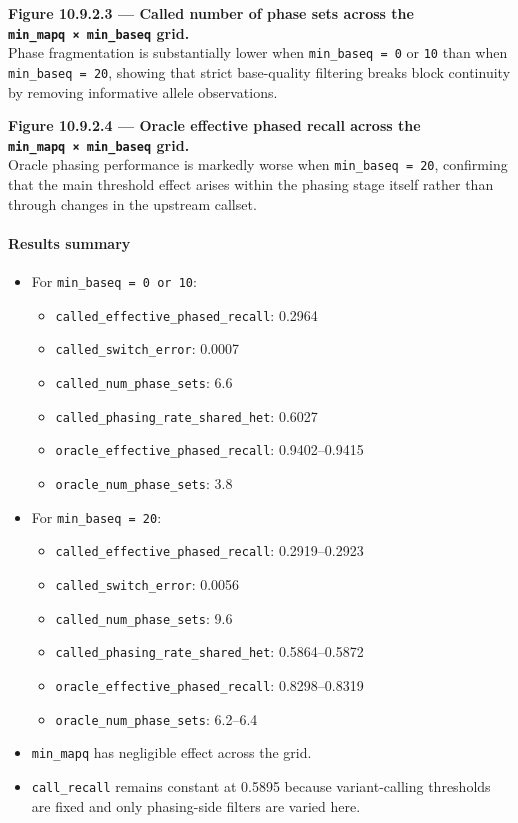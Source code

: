 \documentclass[
]{article}
\providecommand{\tightlist}{%
  \setlength{\itemsep}{0pt}\setlength{\parskip}{0pt}}
\begin{document}
\textbf{Figure 10.9.2.3 --- Called number of phase sets across the
\texttt{min\_mapq\ ×\ min\_baseq} grid.}\\
Phase fragmentation is substantially lower when
\texttt{min\_baseq\ =\ 0} or \texttt{10} than when
\texttt{min\_baseq\ =\ 20}, showing that strict base-quality filtering
breaks block continuity by removing informative allele observations.

\textbf{Figure 10.9.2.4 --- Oracle effective phased recall across the
\texttt{min\_mapq\ ×\ min\_baseq} grid.}\\
Oracle phasing performance is markedly worse when
\texttt{min\_baseq\ =\ 20}, confirming that the main threshold effect
arises within the phasing stage itself rather than through changes in
the upstream callset.

\paragraph{Results summary}\label{results-summary-1}

\begin{itemize}
\tightlist
\item
  For \texttt{min\_baseq\ =\ 0\ or\ 10}:

  \begin{itemize}
  \tightlist
  \item
    \texttt{called\_effective\_phased\_recall}: 0.2964
  \item
    \texttt{called\_switch\_error}: 0.0007
  \item
    \texttt{called\_num\_phase\_sets}: 6.6
  \item
    \texttt{called\_phasing\_rate\_shared\_het}: 0.6027
  \item
    \texttt{oracle\_effective\_phased\_recall}: 0.9402--0.9415
  \item
    \texttt{oracle\_num\_phase\_sets}: 3.8
  \end{itemize}
\item
  For \texttt{min\_baseq\ =\ 20}:

  \begin{itemize}
  \tightlist
  \item
    \texttt{called\_effective\_phased\_recall}: 0.2919--0.2923
  \item
    \texttt{called\_switch\_error}: 0.0056
  \item
    \texttt{called\_num\_phase\_sets}: 9.6
  \item
    \texttt{called\_phasing\_rate\_shared\_het}: 0.5864--0.5872
  \item
    \texttt{oracle\_effective\_phased\_recall}: 0.8298--0.8319
  \item
    \texttt{oracle\_num\_phase\_sets}: 6.2--6.4
  \end{itemize}
\item
  \texttt{min\_mapq} has negligible effect across the grid.
\item
  \texttt{call\_recall} remains constant at 0.5895 because
  variant-calling thresholds are fixed and only phasing-side filters are
  varied here.
\end{itemize}
\end{document}
